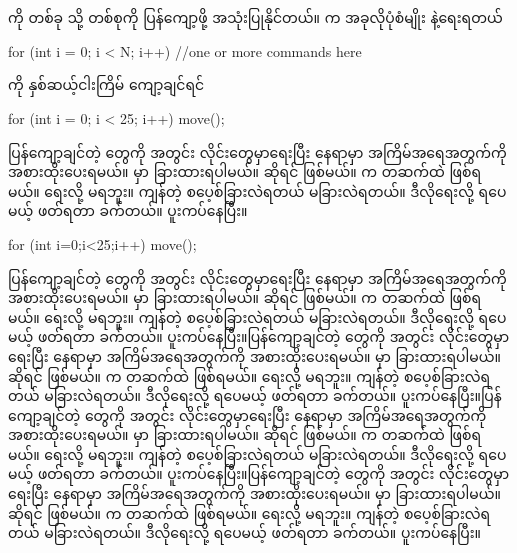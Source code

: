 \begin{sloppypar}
\section{{} }
  ကို \mmcommand တစ်ခု သို့ တစ်စုကို ပြန်ကျော့ဖို့ အသုံးပြုနိုင်တယ်။ \mmsyntax က အခုလိုပုံစံမျိုး နဲ့ရေးရတယ်  
\begin{lstcodeminimal}[]
for (int i = 0; i < N; i++) {
    //one or more commands here
}
\end{lstcodeminimal}
 ကို နှစ်ဆယ့်ငါးကြိမ် ကျော့ချင်ရင် 
\begin{lstcodeminimal}[]
for (int i = 0; i < 25; i++) {
    move();
}
\end{lstcodeminimal}
ပြန်ကျော့ချင်တဲ့ \mmcommand တွေကို \mmcurlybrpair အတွင်း လိုင်းတွေမှာရေးပြီး  နေရာမှာ အကြိမ်အရေအတွက်ကို အစားထိုးပေးရမယ်။  မှာ ခြားထားရပါမယ်။  ဆိုရင် \mmsyntaxerr ဖြစ်မယ်။  က တဆက်ထဲ ဖြစ်ရမယ်။  ရေးလို့ မရဘူး။ ကျန်တဲ့ စပေ့စ်ခြားလဲရတယ် မခြားလဲရတယ်။ ဒီလိုရေးလို့ ရပေမယ့် ဖတ်ရတာ ခက်တယ်။ ပူးကပ်နေပြီး။
\begin{lstcodeminimal}[]
for (int i=0;i<25;i++){
move();
}
\end{lstcodeminimal}
\afterpage{\blankpage}
ပြန်ကျော့ချင်တဲ့ \mmcommand တွေကို \mmcurlybrpair အတွင်း လိုင်းတွေမှာရေးပြီး  နေရာမှာ အကြိမ်အရေအတွက်ကို အစားထိုးပေးရမယ်။  မှာ ခြားထားရပါမယ်။  ဆိုရင် \mmsyntaxerr ဖြစ်မယ်။  က တဆက်ထဲ ဖြစ်ရမယ်။  ရေးလို့ မရဘူး။ ကျန်တဲ့ စပေ့စ်ခြားလဲရတယ် မခြားလဲရတယ်။ ဒီလိုရေးလို့ ရပေမယ့် ဖတ်ရတာ ခက်တယ်။ ပူးကပ်နေပြီး။ပြန်ကျော့ချင်တဲ့ \mmcommand တွေကို \mmcurlybrpair အတွင်း လိုင်းတွေမှာရေးပြီး  နေရာမှာ အကြိမ်အရေအတွက်ကို အစားထိုးပေးရမယ်။  မှာ ခြားထားရပါမယ်။  ဆိုရင် \mmsyntaxerr ဖြစ်မယ်။  က တဆက်ထဲ ဖြစ်ရမယ်။  ရေးလို့ မရဘူး။ ကျန်တဲ့ စပေ့စ်ခြားလဲရတယ် မခြားလဲရတယ်။ ဒီလိုရေးလို့ ရပေမယ့် ဖတ်ရတာ ခက်တယ်။ ပူးကပ်နေပြီး။ပြန်ကျော့ချင်တဲ့ \mmcommand တွေကို \mmcurlybrpair အတွင်း လိုင်းတွေမှာရေးပြီး  နေရာမှာ အကြိမ်အရေအတွက်ကို အစားထိုးပေးရမယ်။  မှာ ခြားထားရပါမယ်။  ဆိုရင် \mmsyntaxerr ဖြစ်မယ်။  က တဆက်ထဲ ဖြစ်ရမယ်။  ရေးလို့ မရဘူး။ ကျန်တဲ့ စပေ့စ်ခြားလဲရတယ် မခြားလဲရတယ်။ ဒီလိုရေးလို့ ရပေမယ့် ဖတ်ရတာ ခက်တယ်။ ပူးကပ်နေပြီး။ပြန်ကျော့ချင်တဲ့ \mmcommand တွေကို \mmcurlybrpair အတွင်း လိုင်းတွေမှာရေးပြီး  နေရာမှာ အကြိမ်အရေအတွက်ကို အစားထိုးပေးရမယ်။  မှာ ခြားထားရပါမယ်။  ဆိုရင် \mmsyntaxerr ဖြစ်မယ်။  က တဆက်ထဲ ဖြစ်ရမယ်။  ရေးလို့ မရဘူး။ ကျန်တဲ့ စပေ့စ်ခြားလဲရတယ် မခြားလဲရတယ်။ ဒီလိုရေးလို့ ရပေမယ့် ဖတ်ရတာ ခက်တယ်။ ပူးကပ်နေပြီး။

\end{sloppypar}
